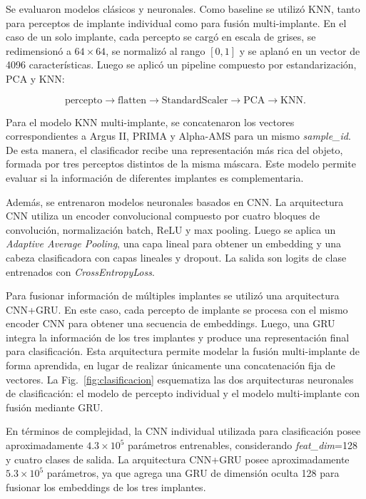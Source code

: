 \documentclass[conference,a4paper]{IEEEtran}
\begin{document}
Se evaluaron modelos clásicos y neuronales. Como baseline se utilizó KNN, tanto para perceptos de implante individual como para fusión multi-implante. En el caso de un solo implante, cada percepto se cargó en escala de grises, se redimensionó a $64 \times 64$, se normalizó al rango $[0,1]$ y se aplanó en un vector de 4096 características. Luego se aplicó un pipeline compuesto por estandarización, PCA y KNN:

\begin{equation}
\text{percepto} \rightarrow \text{flatten} \rightarrow \text{StandardScaler} \rightarrow \text{PCA} \rightarrow \text{KNN}.
\end{equation}

Para el modelo KNN multi-implante, se concatenaron los vectores correspondientes a Argus II, PRIMA y Alpha-AMS para un mismo \textit{sample\_id}. De esta manera, el clasificador recibe una representación más rica del objeto, formada por tres perceptos distintos de la misma máscara. Este modelo permite evaluar si la información de diferentes implantes es complementaria.

Además, se entrenaron modelos neuronales basados en CNN. La arquitectura CNN utiliza un encoder convolucional compuesto por cuatro bloques de convolución, normalización batch, ReLU y max pooling. Luego se aplica un \textit{Adaptive Average Pooling}, una capa lineal para obtener un embedding y una cabeza clasificadora con capas lineales y dropout. La salida son logits de clase entrenados con \textit{CrossEntropyLoss}.

Para fusionar información de múltiples implantes se utilizó una arquitectura CNN+GRU. En este caso, cada percepto de implante se procesa con el mismo encoder CNN para obtener una secuencia de embeddings. Luego, una GRU integra la información de los tres implantes y produce una representación final para clasificación. Esta arquitectura permite modelar la fusión multi-implante de forma aprendida, en lugar de realizar únicamente una concatenación fija de vectores. La Fig.~\ref{fig:clasificacion} esquematiza las dos arquitecturas neuronales de clasificación: el modelo de percepto individual y el modelo multi-implante con fusión mediante GRU. 

En términos de complejidad, la CNN individual utilizada para clasificación posee aproximadamente $4.3 \times 10^5$ parámetros entrenables, considerando \textit{feat\_dim}=128 y cuatro clases de salida. La arquitectura CNN+GRU posee aproximadamente $5.3 \times 10^5$ parámetros, ya que agrega una GRU de dimensión oculta 128 para fusionar los embeddings de los tres implantes.
\end{document}
